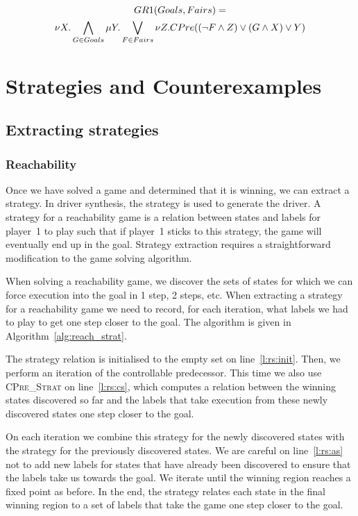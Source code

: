 \begin{multline}
    GR1(Goals, Fairs) = \\ \nu X. \bigwedge_{G \in Goals} \mu Y. \bigvee_{F \in Fairs} \nu Z. CPre((\neg F \wedge Z) \vee (G \wedge X) \vee Y)
\label{eqn:mu_gr1}
\end{multline}

\section{Strategies and Counterexamples}
\label{sec:strat_and_cex2}

\subsection{Extracting strategies}

\subsubsection{Reachability}

Once we have solved a game and determined that it is winning, we can extract a strategy. In driver synthesis, the strategy is used to generate the driver. A strategy for a reachability game is a relation between states and labels for player~1 to play such that if player~1 sticks to this strategy, the game will eventually end up in the goal. Strategy extraction requires a straightforward modification to the game solving algorithm.

When solving a reachability game, we discover the sets of states for which we can force execution into the goal in 1 step, 2 steps, etc. When extracting a strategy for a reachability game we need to record, for each iteration, what labels we had to play to get one step closer to the goal. The algorithm is given in Algorithm~\ref{alg:reach_strat}. 

The strategy relation is initialised to the empty set on line~\ref{l:rs:init}. Then, we perform an iteration of the controllable predecessor. This time we also use \textsc{CPre\_Strat} on line~\ref{l:rs:cs}, which computes a relation between the winning states discovered so far and the labels that take execution from these newly discovered states one step closer to the goal.

On each iteration we combine this strategy for the newly discovered states with the strategy for the previously discovered states. We are careful on line~\ref{l:rs:as} not to add new labels for states that have already been discovered to ensure that the labels take us towards the goal. We iterate until the winning region reaches a fixed point as before. In the end, the strategy relates each state in the final winning region to a set of labels that take the game one step closer to the goal.

